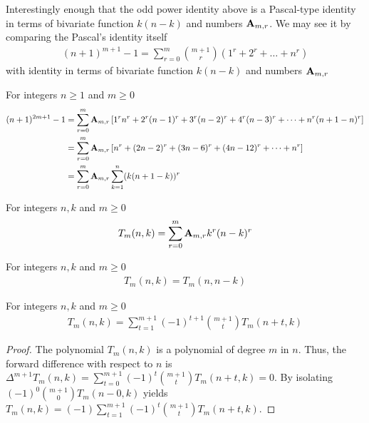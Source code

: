 Interestingly enough that the odd power identity above is a Pascal-type identity
in terms of bivariate function $k(n-k)$ and numbers ${\mathbf{A}} \sb{m,r}$.
We may see it by comparing the Pascal's identity itself~\cite{macmillan2011proofs}
\begin{align*}
(n+1)
    ^{m+1}-1 = \sum_{r=0}^{m} \binom{m+1}{r} \left( 1^{r}+2^{r} + \dots + n^{r} \right)
\end{align*}
with identity in terms of bivariate function $k(n-k)$ and numbers ${\mathbf{A}} \sb{m,r}$
\begin{corollary}
    For integers $n \geq 1$ and $m\geq 0$
    \begin{align*}
    (n+1)
        ^{2m+1} - 1
        &= \sum_{r=0}^{m} {\mathbf{A}} \sb{m,r} \left[ 1^r n^r + 2^r (n-1)^r + 3^r (n-2)^r + 4^r (n-3)^r + \cdots + n^r (n+1-n)^r  \right] \\
        &= \sum_{r=0}^{m} {\mathbf{A}} \sb{m,r} \left[ n^r + (2n-2)^r + (3n-6)^r + (4n-12)^r + \cdots + n^r  \right] \\
        &= \sum_{r=0}^{m} {\mathbf{A}} \sb{m,r} \sum_{k=1}^{n} (k (n+1-k))^r
    \end{align*}
\end{corollary}
\begin{definition}
    For integers $n,k$ and $m \geq 0$
    \label{def:bivariate-sum-Tm}
    \begin{align*}
        T_{m}(n,k) = \sum_{r=0}^{m} {\mathbf{A}} \sb{m,r} k^r (n-k)^r
    \end{align*}
\end{definition}

\begin{proposition}[Symmetry of $T_m$]
    \label{prop:Tm-symmetry}
    For integers $n,k$ and $m\geq 0$
    \begin{align*}
        T_{m} (n, k) = T_{m} (n, n-k)
    \end{align*}
\end{proposition}
\begin{proposition}
    For integers $n,k$ and $m\geq 0$
    \label{prop:Tm-recurrence-forward}
    \begin{align*}
        T_{m} (n,k) = \sum_{t=1}^{m+1} (-1)^{t+1} \binom{m+1}{t} T_{m} (n+t, k)
    \end{align*}
    \begin{proof}
        The polynomial $T_{m} (n,k)$ is a polynomial of degree $m$ in $n$.
        Thus, the forward difference with respect to $n$ is
        $\Delta^{m+1} T_{m} (n, k) = \sum_{t=0}^{m+1} (-1)^{t} \binom{m+1}{t} T_{m} (n+t, k) = 0$.
        By isolating $(-1)^{0} \binom{m+1}{0} T_{m} (n-0, k)$ yields
        $T_{m} (n, k) = (-1) \sum_{t=1}^{m+1} (-1)^{t} \binom{m+1}{t} T_{m} (n+t, k)$.
    \end{proof}
\end{proposition}

